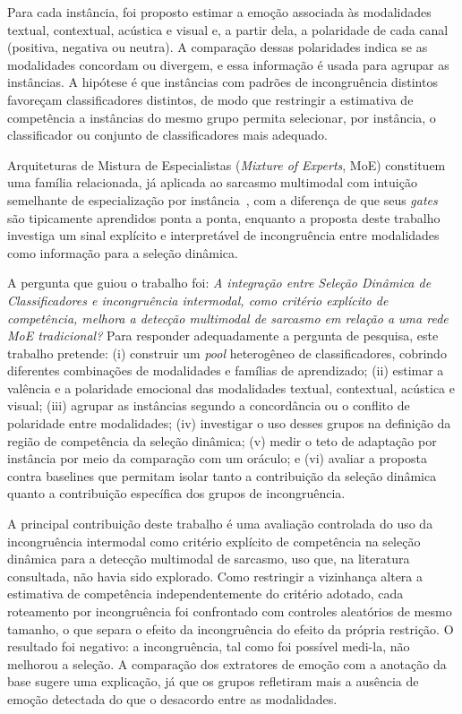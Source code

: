 \documentclass[conference]{IEEEtran}
\begin{document}
Para cada instância, foi proposto estimar a emoção associada às modalidades textual, contextual, acústica e visual e, a partir dela, a polaridade de cada canal (positiva, negativa ou neutra). A comparação dessas polaridades indica se as modalidades concordam ou divergem, e essa informação é usada para agrupar as instâncias. A hipótese é que instâncias com padrões de incongruência distintos favoreçam classificadores distintos, de modo que restringir a estimativa de competência a instâncias do mesmo grupo permita selecionar, por instância, o classificador ou conjunto de classificadores mais adequado.

Arquiteturas de Mistura de Especialistas (\textit{Mixture of Experts}, MoE) constituem uma família relacionada, já aplicada ao sarcasmo multimodal com intuição semelhante de especialização por instância~\cite{yu2024mmoe, zhao2025beyond}, com a diferença de que seus \textit{gates} são tipicamente aprendidos ponta a ponta, enquanto a proposta deste trabalho investiga um sinal explícito e interpretável de incongruência entre modalidades como informação para a seleção dinâmica.

A pergunta que guiou o trabalho foi: \textit{A integração entre Seleção Dinâmica de Classificadores e incongruência intermodal, como critério explícito de competência, melhora a detecção multimodal de sarcasmo em relação a uma rede MoE tradicional?} Para responder adequadamente a pergunta de pesquisa, este trabalho pretende: (i) construir um \textit{pool} heterogêneo de classificadores, cobrindo diferentes combinações de modalidades e famílias de aprendizado; (ii) estimar a valência e a polaridade emocional das modalidades textual, contextual, acústica e visual; (iii) agrupar as instâncias segundo a concordância ou o conflito de polaridade entre modalidades; (iv) investigar o uso desses grupos na definição da região de competência da seleção dinâmica; (v) medir o teto de adaptação por instância por meio da comparação com um oráculo; e (vi) avaliar a proposta contra baselines que permitam isolar tanto a contribuição da seleção dinâmica quanto a contribuição específica dos grupos de incongruência.

A principal contribuição deste trabalho é uma avaliação controlada do uso da incongruência intermodal como critério explícito de competência na seleção dinâmica para a detecção multimodal de sarcasmo, uso que, na literatura consultada, não havia sido explorado. Como restringir a vizinhança altera a estimativa de competência independentemente do critério adotado, cada roteamento por incongruência foi confrontado com controles aleatórios de mesmo tamanho, o que separa o efeito da incongruência do efeito da própria restrição. O resultado foi negativo: a incongruência, tal como foi possível medi-la, não melhorou a seleção. A comparação dos extratores de emoção com a anotação da base sugere uma explicação, já que os grupos refletiram mais a ausência de emoção detectada do que o desacordo entre as modalidades.
\end{document}
